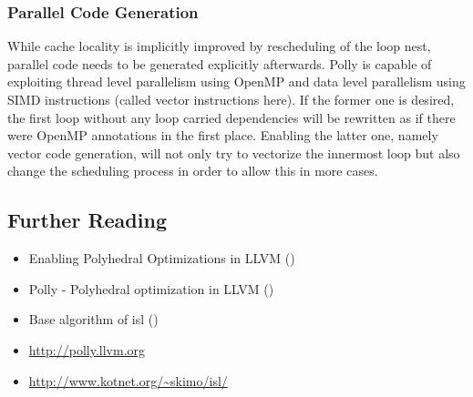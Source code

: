 \subsubsection{Parallel Code Generation}
While cache locality is implicitly improved by rescheduling of the loop nest, 
parallel code needs to be generated explicitly afterwards.
Polly is capable of exploiting thread level parallelism using OpenMP \cite{raghesh2011framework}
and data level parallelism using SIMD instructions (called vector instructions here). 
If the former one is desired, the first loop without any loop carried 
dependencies will be rewritten as if there were OpenMP annotations in the first
place. Enabling the latter one, namely vector code generation, 
will not only try to vectorize the innermost loop but also change the  
scheduling process in order to allow this in more cases.



\subsection*{Further Reading}

\begin{itemize}
  \item Enabling Polyhedral Optimizations in LLVM (\citet{grosser:thesis})
  \item Polly - Polyhedral optimization in LLVM (\citet{grosser.11.impact})  
  \item Base algorithm of isl (\citet{Bondhugula:2008:PAP:1379022.1375595})
  \item \url{http://polly.llvm.org} \nocite{Polly:Online}
  \item \url{http://www.kotnet.org/~skimo/isl/} \nocite{ISL:Online}
\end{itemize}





\clearpage
